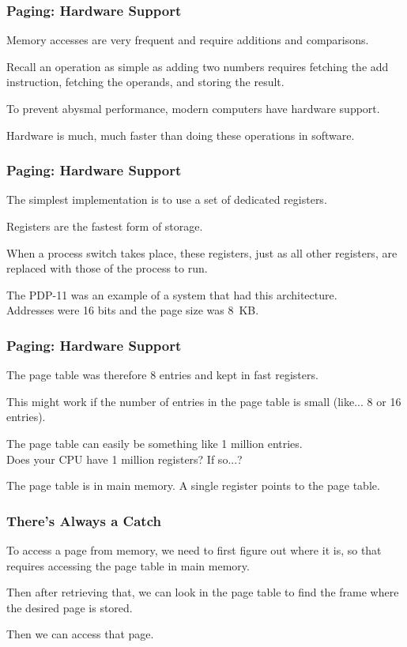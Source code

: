 \begin{frame}
\frametitle{Paging: Hardware Support}

Memory accesses are very frequent and require additions and comparisons. 

Recall an operation as simple as adding two numbers requires fetching the add instruction, fetching the operands, and storing the result. 

To prevent abysmal performance, modern computers have hardware support.

Hardware is much, much faster than doing these operations in software.



\end{frame}

\begin{frame}
\frametitle{Paging: Hardware Support}

The simplest implementation is to use a set of dedicated registers.

Registers are the fastest form of storage. 

When a process switch takes place, these registers, just as all other registers, are replaced with those of the process to run. 

The PDP-11 was an example of a system that had this architecture.\\
\quad Addresses were 16 bits and the page size was 8~KB.

\end{frame}

\begin{frame}
\frametitle{Paging: Hardware Support}

The page table was therefore 8 entries and kept in fast registers. 

This might work if the number of entries in the page table is small (like... 8 or 16 entries). 

The page table can easily be something like 1 million entries.\\
\quad Does your CPU have 1 million registers? If so...?

The page table is in main memory. A single register points to the page table.


\end{frame}

\begin{frame}
\frametitle{There's Always a Catch}

To access a page from memory, we need to first figure out where it is, so that requires accessing the page table in main memory. 

Then after retrieving that, we can look in the page table to find the frame where the desired page is stored. 

Then we can access that page. 

\end{frame}

